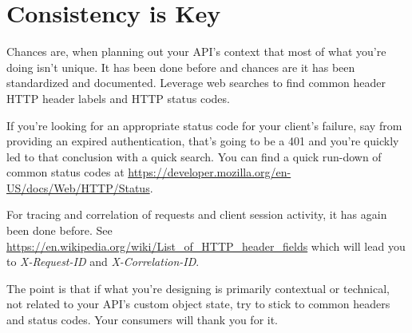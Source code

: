 \section{Consistency is Key}

Chances are, when planning out your API's context that most of what you're doing isn't unique.  It has been done before and chances are it has been standardized and documented.  Leverage web searches to find common header HTTP header labels and HTTP status codes.

If you're looking for an appropriate status code for your client's failure, say from providing an expired authentication, that's going to be a 401 and you're quickly led to that conclusion with a quick search.  You can find a quick run-down of common status codes at \url{https://developer.mozilla.org/en-US/docs/Web/HTTP/Status}.

For tracing and correlation of requests and client session activity, it has again been done before.  See \url{https://en.wikipedia.org/wiki/List_of_HTTP_header_fields} which will lead you to \textit{X-Request-ID} and \textit{X-Correlation-ID}.

The point is that if what you're designing is primarily contextual or technical, not related to your API's custom object state, try to stick to common headers and status codes.  Your consumers will thank you for it.
